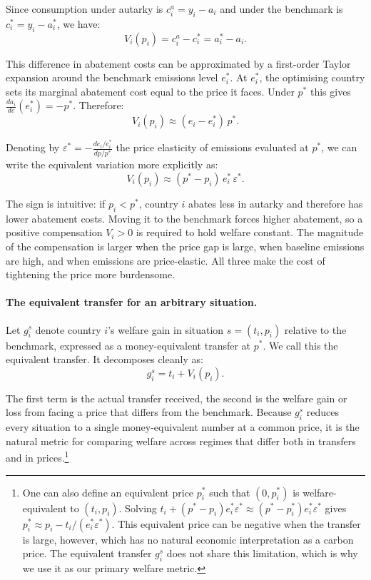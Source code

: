 \documentclass[12pt,english]{article}
\begin{document}
Since consumption under autarky is $c^a_i = y_i - a_i$ and under the benchmark is $c^*_i = y_i - a^*_i$, we have:
\begin{equation}
    V_i(p_i) = c^a_i - c^*_i = a^*_i - a_i.
\end{equation}

This difference in abatement costs can be approximated by a first-order Taylor expansion around the benchmark emissions level $e^*_i$. At $e^*_i$, the optimising country sets its marginal abatement cost equal to the price it faces. Under $p^*$ this gives $\frac{da_i}{de}(e^*_i) = -p^*$. Therefore:
\begin{equation}
    V_i(p_i)
    \approx (e_i - e^*_i)\,p^*.
    \label{eq:Vi_approx}
\end{equation}

Denoting by $\varepsilon^* = -\frac{de_i/e^*_i}{dp/p^*}$ the price elasticity of emissions evaluated at $p^*$, we can write the equivalent variation more explicitly as:
\begin{equation}
    V_i(p_i) \approx (p^* - p_i)\,e^*_i\,\varepsilon^*.
    \label{eq:Vi_price}
\end{equation}

The sign is intuitive: if $p_i < p^*$, country $i$ abates less in autarky and therefore has lower abatement costs. Moving it to the benchmark forces higher abatement, so a positive compensation $V_i > 0$ is required to hold welfare constant. The magnitude of the compensation is larger when the price gap is large, when baseline emissions are high, and when emissions are price-elastic. All three make the cost of tightening the price more burdensome.

\paragraph{The equivalent transfer for an arbitrary situation.} Let $g^s_i$ denote country $i$'s welfare gain in situation $s = (t_i, p_i)$ relative to the benchmark, expressed as a money-equivalent transfer at $p^*$. We call this the equivalent transfer. It decomposes cleanly as:
\begin{equation}
    g^s_i = t_i + V_i(p_i).
    \label{eq:gsi}
\end{equation}

The first term is the actual transfer received, the second is the welfare gain or loss from facing a price that differs from the benchmark. Because $g^s_i$ reduces every situation to a single money-equivalent number at a common price, it is the natural metric for comparing welfare across regimes that differ both in transfers and in prices.\footnote{One can also define an equivalent price $p^*_i$ such that $(0, p^*_i)$ is welfare-equivalent to $(t_i, p_i)$. Solving $t_i + (p^* - p_i)e^*_i \varepsilon^* \approx (p^* - p^*_i)e^*_i\varepsilon^*$ gives $p^*_i \approx p_i -t_i/(e^*_i\varepsilon^*)$. This equivalent price can be negative when the transfer is large, however, which has no natural economic interpretation as a carbon price. The equivalent transfer $g^s_i$ does not share this limitation, which is why we use it as our primary welfare metric.}
\end{document}
